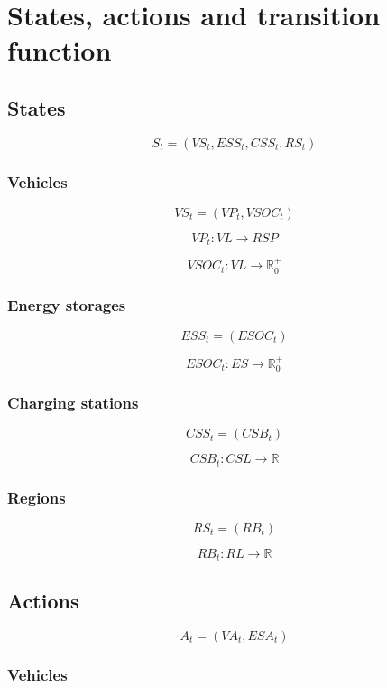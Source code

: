 \section{States, actions and transition function}

\subsection{States}

\[
	S_t = (VS_t, ESS_t, CSS_t, RS_t)
\]

\subsubsection{Vehicles}

\[
	VS_t = (VP_t, VSOC_t)
\]

\[
	VP_t: VL \rightarrow RSP
\]

\[
	VSOC_t: VL \rightarrow \mathbb{R}_0^+
\]

\subsubsection{Energy storages}

\[
	ESS_t = (ESOC_t)
\]

\[
	ESOC_t: ES \rightarrow \mathbb{R}_0^+
\]

\subsubsection{Charging stations}

\[
	CSS_t = (CSB_t)
\]

\[
	CSB_t: CSL \rightarrow \mathbb{R}
\]

\subsubsection{Regions}

\[
	RS_t = (RB_t)
\]

\[
	RB_t: RL \rightarrow \mathbb{R}
\]

\subsection{Actions}

\[
	A_t = (VA_t, ESA_t)
\]

\subsubsection{Vehicles}

